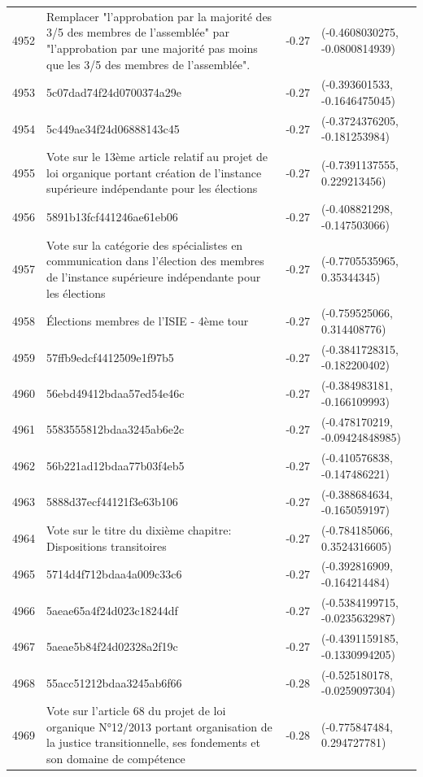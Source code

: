 \begin{table}[ht]
\begin{tabular}{rlrl}
  4952 & Remplacer "l'approbation par la majorité des 3/5 des membres de l'assemblée" par "l'approbation par une majorité pas moins que les 3/5 des membres de l'assemblée". & -0.27 & (-0.4608030275, -0.0800814939) \\ 
  4953 & 5c07dad74f24d0700374a29e & -0.27 & (-0.393601533, -0.1646475045) \\ 
  4954 & 5c449ae34f24d06888143c45 & -0.27 & (-0.3724376205, -0.181253984) \\ 
  4955 & Vote sur le 13ème article relatif au projet de loi organique portant création de l'instance supérieure indépendante pour les élections & -0.27 & (-0.7391137555, 0.229213456) \\ 
  4956 & 5891b13fcf441246ae61eb06 & -0.27 & (-0.408821298, -0.147503066) \\ 
  4957 & Vote sur la catégorie des spécialistes en communication dans l'élection des membres de l'instance supérieure indépendante pour les élections & -0.27 & (-0.7705535965, 0.35344345) \\ 
  4958 & Élections membres de l'ISIE - 4ème tour & -0.27 & (-0.759525066, 0.314408776) \\ 
  4959 & 57ffb9edcf4412509e1f97b5 & -0.27 & (-0.3841728315, -0.182200402) \\ 
  4960 & 56ebd49412bdaa57ed54e46c & -0.27 & (-0.384983181, -0.166109993) \\ 
  4961 & 5583555812bdaa3245ab6e2c & -0.27 & (-0.478170219, -0.09424848985) \\ 
  4962 & 56b221ad12bdaa77b03f4eb5 & -0.27 & (-0.410576838, -0.147486221) \\ 
  4963 & 5888d37ecf44121f3e63b106 & -0.27 & (-0.388684634, -0.165059197) \\ 
  4964 & Vote sur le titre du dixième chapitre: Dispositions transitoires & -0.27 & (-0.784185066, 0.3524316605) \\ 
  4965 & 5714d4f712bdaa4a009c33c6 & -0.27 & (-0.392816909, -0.164214484) \\ 
  4966 & 5aeae65a4f24d023c18244df & -0.27 & (-0.5384199715, -0.0235632987) \\ 
  4967 & 5aeae5b84f24d02328a2f19c & -0.27 & (-0.4391159185, -0.1330994205) \\ 
  4968 & 55acc51212bdaa3245ab6f66 & -0.28 & (-0.525180178, -0.0259097304) \\ 
  4969 & Vote sur l'article 68 du projet de loi organique N°12/2013 portant organisation de la justice transitionnelle, ses fondements et son domaine de compétence & -0.28 & (-0.775847484, 0.294727781) \\ 

\end{tabular}
\end{table}
